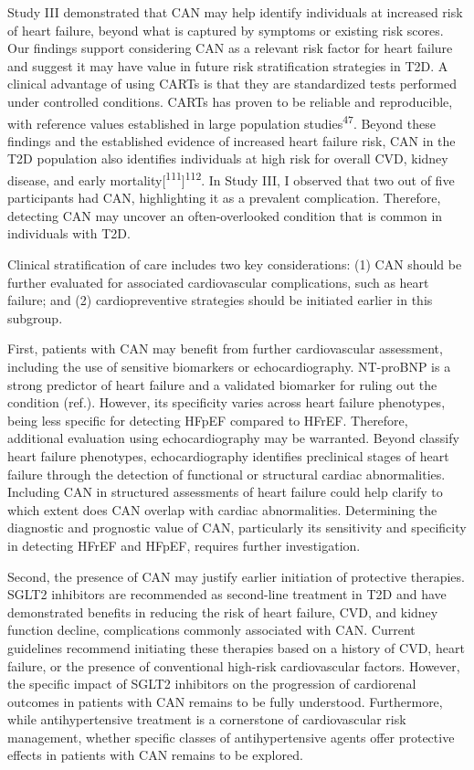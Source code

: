 \documentclass[
  a4paper,
  headsepline=true,
  open=any]{scrbook}
\begin{document}
Study III demonstrated that CAN may help identify individuals at
increased risk of heart failure, beyond what is captured by symptoms or
existing risk scores. Our findings support considering CAN as a relevant
risk factor for heart failure and suggest it may have value in future
risk stratification strategies in T2D. A clinical advantage of using
CARTs is that they are standardized tests performed under controlled
conditions. CARTs has proven to be reliable and reproducible, with
reference values established in large population
studies\textsuperscript{47}. Beyond these findings and the established
evidence of increased heart failure risk, CAN in the T2D population also
identifies individuals at high risk for overall CVD, kidney disease, and
early mortality{[}\textsuperscript{111}{]}\textsuperscript{112}. In
Study III, I observed that two out of five participants had CAN,
highlighting it as a prevalent complication. Therefore, detecting CAN
may uncover an often-overlooked condition that is common in individuals
with T2D.

Clinical stratification of care includes two key considerations: (1) CAN
should be further evaluated for associated cardiovascular complications,
such as heart failure; and (2) cardiopreventive strategies should be
initiated earlier in this subgroup.

First, patients with CAN may benefit from further cardiovascular
assessment, including the use of sensitive biomarkers or
echocardiography. NT-proBNP is a strong predictor of heart failure and a
validated biomarker for ruling out the condition (ref.). However, its
specificity varies across heart failure phenotypes, being less specific
for detecting HFpEF compared to HFrEF. Therefore, additional evaluation
using echocardiography may be warranted. Beyond classify heart failure
phenotypes, echocardiography identifies preclinical stages of heart
failure through the detection of functional or structural cardiac
abnormalities. Including CAN in structured assessments of heart failure
could help clarify to which extent does CAN overlap with cardiac
abnormalities. Determining the diagnostic and prognostic value of CAN,
particularly its sensitivity and specificity in detecting HFrEF and
HFpEF, requires further investigation.

Second, the presence of CAN may justify earlier initiation of protective
therapies. SGLT2 inhibitors are recommended as second-line treatment in
T2D and have demonstrated benefits in reducing the risk of heart
failure, CVD, and kidney function decline, complications commonly
associated with CAN. Current guidelines recommend initiating these
therapies based on a history of CVD, heart failure, or the presence of
conventional high-risk cardiovascular factors. However, the specific
impact of SGLT2 inhibitors on the progression of cardiorenal outcomes in
patients with CAN remains to be fully understood. Furthermore, while
antihypertensive treatment is a cornerstone of cardiovascular risk
management, whether specific classes of antihypertensive agents offer
protective effects in patients with CAN remains to be explored.
\end{document}
